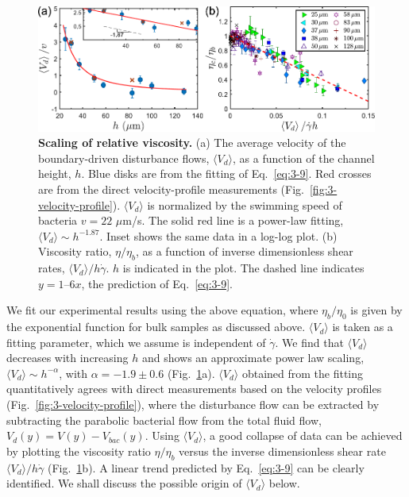 \begin{figure}[!ht]
	\begin{center}
	\includegraphics[width=5.5 in]{Figs/3-Rheo/6.pdf}
	\end{center}
	\caption[Scaling of relative viscosity of bacterial suspensions]
	{
	\textbf{Scaling of relative viscosity.}
   (a) The average velocity of the boundary-driven disturbance flows, $\langle V_d \rangle$, as a function of the channel height, $h$. Blue disks are from the fitting of Eq.~\ref{eq:3-9}. Red crosses are from the direct velocity-profile measurements (Fig.~\ref{fig:3-velocity-profile}). $\langle V_d \rangle$ is normalized by the swimming speed of bacteria $v = 22$ $\mu$m/s. The solid red line is a power-law fitting, $\langle V_d \rangle \sim h^{-1.87}$. Inset shows the same data in a log-log plot.
   (b) Viscosity ratio, $\eta/\eta_b$, as a function of inverse dimensionless shear rates, $\langle V_d \rangle / h\dot\gamma$. $h$ is indicated in the plot. The dashed line indicates $y = 1 – 6x$, the prediction of Eq.~\ref{eq:3-9}.
  }
	\label{fig:3-scaling}
\end{figure}


We fit our experimental results using the above equation, where $\eta_b/\eta_0$ is given by the exponential function for bulk samples as discussed above. $\langle V_d \rangle$ is taken as a fitting parameter, which we assume is independent of $\dot\gamma$. We find that $\langle V_d \rangle$ decreases with increasing $h$ and shows an approximate power law scaling, $\langle V_d \rangle \sim h^{-\alpha}$, with $\alpha = - 1.9 \pm 0.6$ (Fig.~\ref{fig:3-scaling}a).
$\langle V_d \rangle$ obtained from the fitting quantitatively agrees with direct measurements based on the velocity profiles (Fig.~\ref{fig:3-velocity-profile}), where the disturbance flow can be extracted by subtracting the parabolic bacterial flow from the total fluid flow, $V_d(y) = V(y) - V_{bac}(y)$. Using $\langle V_d \rangle$, a good collapse of data can be achieved by plotting the viscosity ratio $\eta/\eta_b$ versus the inverse dimensionless shear rate $\langle V_d \rangle / h\dot\gamma$ (Fig.~\ref{fig:3-scaling}b).
A linear trend predicted by Eq.~\ref{eq:3-9} can be clearly identified. We shall discuss the possible origin of $\langle V_d \rangle$ below.

